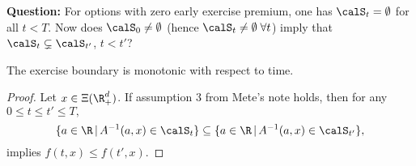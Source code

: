 \flushleft \textbf{Question:}
 For options with zero early exercise premium, one has $\calS_t = \emptyset$ for all $t<T$. Now does $\calS_0 \neq \emptyset$ (hence $\calS_t \neq \emptyset \; \forall t$)
imply that $\calS_t \boldsymbol{\subsetneq} \calS_{t'}$, $t<t'$?   


\begin{corollary}
\label{cor:monot}
The exercise boundary  is monotonic with respect to time.
\end{corollary}
\begin{proof}  Let $x\in \Xi(\R_+^d)$. If assumption $3$ from Mete's note holds, then for any $0\leq t \leq  t' \leq T,$
$$\{a \in \R \, |\, A^{-1}(a,x) \in \calS_t\} \subseteq \{a \in \R \, |\, A^{-1}(a,x) \in \calS_{t'}\},$$
implies $f(t,x) \leq f(t',x).$ 
\end{proof}

